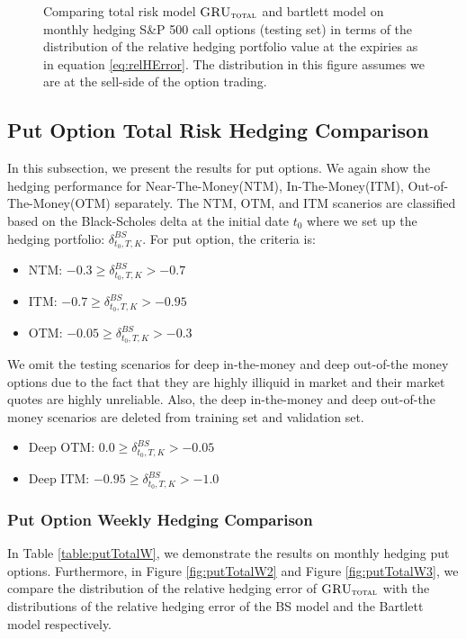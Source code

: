\documentclass[letterpaper,12pt,titlepage,oneside,final]{book}
\numberwithin{equation}{section}
\theoremstyle{definition}
\newcommand{\modelT}{\textsc{GRU}_{\textsc{total}}}
\begin{document}
\begin{figure}[htp!]
	\caption{Comparing total risk model $\modelT$ and bartlett model on monthly hedging S\&P 500 call options (testing set) in terms of the distribution of the  relative hedging portfolio value at the expiries as in equation \eqref{eq:relHError}. The distribution in this figure assumes we are at the sell-side of the option trading.} \label{fig:CallTotalM3}
\end{figure}

\newpage
\subsection{Put Option Total Risk Hedging Comparison}

In this subsection, we present the results for put options. We again show the hedging performance for Near-The-Money(NTM), In-The-Money(ITM), Out-of-The-Money(OTM) separately.  The NTM, OTM, and ITM scanerios are classified based on the Black-Scholes delta at the initial date $t_0$ where we set up the hedging portfolio: $\delta^{BS}_{t_0,T,K}$. For put option, the criteria is:
\begin{itemize}
	\item  NTM: $-0.3 \geq \delta^{BS}_{t_0,T,K} >-0.7$
	\item ITM: $-0.7 \geq \delta^{BS}_{t_0,T,K} >-0.95$
	\item  OTM: $-0.05 \geq \delta^{BS}_{t_0,T,K} >-0.3$
\end{itemize}
We omit the testing scenarios for deep in-the-money and deep out-of-the money options due to the fact that they are highly illiquid in market and their market quotes are highly unreliable. Also, the deep in-the-money and deep out-of-the money scenarios are deleted from training set and validation set.
\begin{itemize}
	\item  Deep OTM: $0.0 \geq \delta^{BS}_{t_0,T,K} >-0.05$
	\item  Deep ITM: $-0.95 \geq \delta^{BS}_{t_0,T,K} >-1.0$
\end{itemize}
\subsubsection{Put Option Weekly Hedging Comparison}
In Table \ref{table:putTotalW}, we demonstrate the results on monthly hedging put options. Furthermore, in Figure \ref{fig:putTotalW2} and  Figure \ref{fig:putTotalW3}, we compare the distribution of the relative hedging error of $\modelT$ with the distributions of the relative hedging error of the BS model and the Bartlett model respectively.
\end{document}

